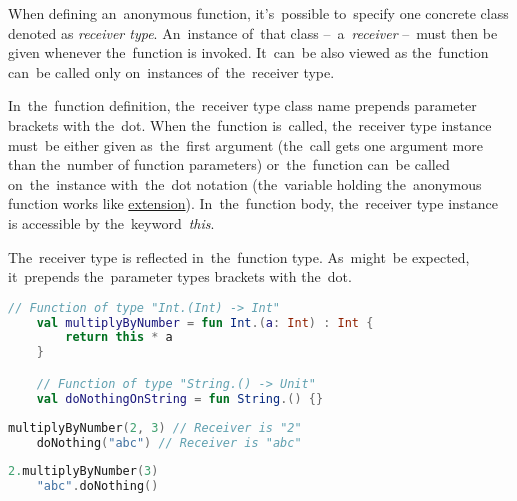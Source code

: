 \label{kotlinanonymousreceivertype}
When defining an~anonymous function, it's~possible to~specify one concrete class denoted as \textit{receiver type}.
An~instance of~that class --~a~\textit{receiver} --~must then be given whenever the~function is invoked.
It~can~be also viewed as the~function can~be called only on~instances of~the~receiver type.

In~the~function definition, the~receiver type class name prepends parameter brackets with the~dot.
When the~function is~called, the~receiver type instance must~be either given as~the~first argument (the~call gets one argument more than the~number of function parameters) or~the~function can~be called on~the~instance with~the~dot notation (the~variable holding the~anonymous function works like \hyperref[kotlinextension]{extension}).
In~the~function body, the~receiver type instance is accessible by the~keyword~\textit{this}.

The~receiver type is reflected in~the~function type.
As~might~be expected, it~prepends the~parameter types brackets with the~dot.
\newline

\example
\begin{lstlisting}[language=Kotlin]
    // Function of type "Int.(Int) -> Int"
    val multiplyByNumber = fun Int.(a: Int) : Int {
        return this * a
    }

    // Function of type "String.() -> Unit"
    val doNothingOnString = fun String.() {}
\end{lstlisting}
\newline

\begin{lstlisting}[language=Kotlin, title={Usage with passing receivers as arguments}]
    multiplyByNumber(2, 3) // Receiver is "2"
    doNothing("abc") // Receiver is "abc"
\end{lstlisting}
\newline

\begin{lstlisting}[language=Kotlin, title={Equivalent with calling on receivers}]
    2.multiplyByNumber(3)
    "abc".doNothing()
\end{lstlisting}
\newpage
